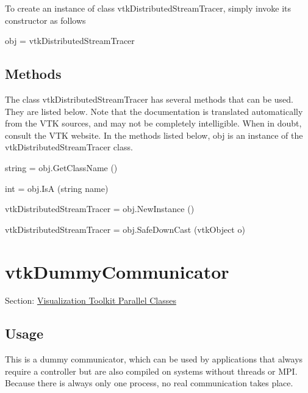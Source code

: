 To create an instance of class vtk\-Distributed\-Stream\-Tracer, simply invoke its constructor as follows \begin{DoxyVerb}  obj = vtkDistributedStreamTracer
\end{DoxyVerb}
 \hypertarget{vtkwidgets_vtkxyplotwidget_Methods}{}\subsection{Methods}\label{vtkwidgets_vtkxyplotwidget_Methods}
The class vtk\-Distributed\-Stream\-Tracer has several methods that can be used. They are listed below. Note that the documentation is translated automatically from the V\-T\-K sources, and may not be completely intelligible. When in doubt, consult the V\-T\-K website. In the methods listed below, {\ttfamily obj} is an instance of the vtk\-Distributed\-Stream\-Tracer class. 
\begin{DoxyItemize}
\item {\ttfamily string = obj.\-Get\-Class\-Name ()}  
\item {\ttfamily int = obj.\-Is\-A (string name)}  
\item {\ttfamily vtk\-Distributed\-Stream\-Tracer = obj.\-New\-Instance ()}  
\item {\ttfamily vtk\-Distributed\-Stream\-Tracer = obj.\-Safe\-Down\-Cast (vtk\-Object o)}  
\end{DoxyItemize}\hypertarget{vtkparallel_vtkdummycommunicator}{}\section{vtk\-Dummy\-Communicator}\label{vtkparallel_vtkdummycommunicator}
Section\-: \hyperlink{sec_vtkparallel}{Visualization Toolkit Parallel Classes} \hypertarget{vtkwidgets_vtkxyplotwidget_Usage}{}\subsection{Usage}\label{vtkwidgets_vtkxyplotwidget_Usage}
This is a dummy communicator, which can be used by applications that always require a controller but are also compiled on systems without threads or M\-P\-I. Because there is always only one process, no real communication takes place.

